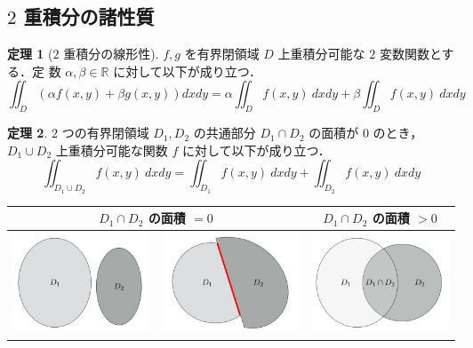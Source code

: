 \documentclass[10pt, uplatex, dvipdfmx]{jsarticle}
\theoremstyle{definition}
\newtheorem{theorem}{定理}[section]
\numberwithin{equation}{section}
\begin{document}
\newpage

\subsection{$2$ 重積分の諸性質}

\begin{theorem}[$2$ 重積分の線形性]
  $f, g$ を有界閉領域 $D$ 上重積分可能な $2$ 変数関数とする．定
  数 $\alpha, \beta \in \mathbb{R}$ に対して以下が成り立つ．
  \[
    \iint_{D}\left( \alpha f(x,y) + \beta g(x,y)\right) dx dy 
    =\alpha \iint_{D} f(x,y) \ dx dy + \beta \iint_{D} f(x,y) \ dx dy
  \]
\end{theorem}

\begin{theorem}
  $2$ つの有界閉領域 $D_1, D_2$ の共通部分 $D_1 \cap D_2$ の面積が $0$
  のとき，$D_1 \cup D_2$ 上重積分可能な関数 $f$ に対して以下が成り立つ．
  \[
    \iint_{D_1 \cup D_2} f(x,y) \ dx dy = \iint_{D_1} f(x,y) \ dx dy + \iint_{D_2} f(x,y) \ dx dy
  \]
  \begin{table}[h]
    \centering
    \begin{tabular}{|cc|c|}\hline
      \multicolumn{2}{|c|}{$D_1 \cap D_2$ の面積 $=0$} & $D_1 \cap D_2$ の面積 $>0$\\ \hline
      \includegraphics[height=3cm]{./pictures/07/disjoint.pdf}
     &\includegraphics[height=3cm]{./pictures/07/tangent.pdf}
     & \includegraphics[height=3cm]{./pictures/07/intersect.pdf}\\ \hline
    \end{tabular}
  \end{table}
\end{theorem}
\end{document}
